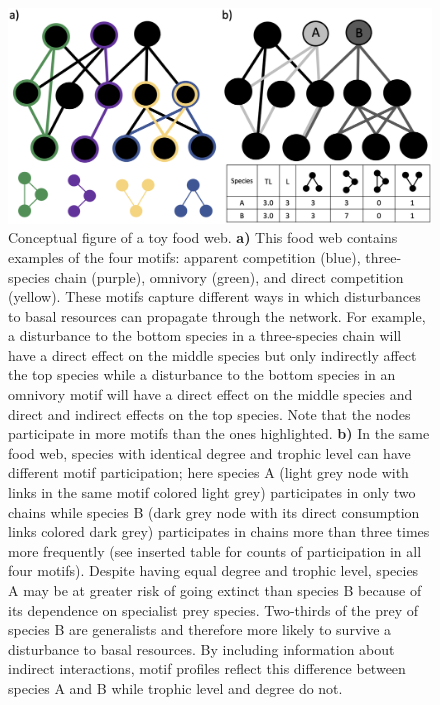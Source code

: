 \documentclass[12pt]{article}
\begin{document}
\begin{spacing}{2.0}
        \begin{figure}[hb!]
        \centering
        \includegraphics[width=1.0\textwidth]{figures/concept_fig_ver2.eps}
        \caption{Conceptual figure of a toy food web. \textbf{a)} This food web contains examples of the four motifs: apparent competition (blue), three-species chain (purple), omnivory (green), and direct competition (yellow). These motifs capture different ways in which disturbances to basal resources can propagate through the network. For example, a disturbance to the bottom species in a three-species chain will have a direct effect on the middle species but only indirectly affect the top species while a disturbance to the bottom species in an omnivory motif will have a direct effect on the middle species and direct and indirect effects on the top species. 
        Note that the nodes participate in more motifs than the ones highlighted. \textbf{b)} In the same food web, species with identical degree and trophic level can have different motif participation; here species A (light grey node with links in the same motif colored light grey) participates in only two chains while species B (dark grey node with its direct consumption links colored dark grey) participates in chains more than three times more frequently (see inserted table for counts of participation in all four motifs). 
        Despite having equal degree and trophic level, species A may be at greater risk of going extinct than species B because of its dependence on specialist prey species. Two-thirds of the prey of species B are generalists and therefore more likely to survive a disturbance to basal resources. By including information about indirect interactions, motif profiles reflect this difference between species A and B while trophic level and degree do not.}
    \label{fig:concept}
    \end{figure}


\end{spacing}
\end{document}
